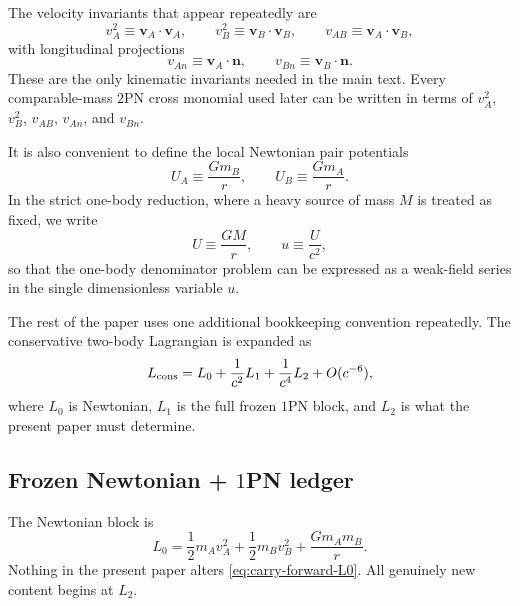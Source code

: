 \documentclass[11pt]{article}
\newcommand{\vct}{\mathbf v}
\newcommand{\nvec}{\mathbf n}
\newcommand{\OnePN}{\mathrm{1PN}}
\newcommand{\TwoPN}{\mathrm{2PN}}
\begin{document}
The velocity invariants that appear repeatedly are
\begin{equation}
v_A^2\equiv \vct_A\!\cdot\!\vct_A,
\qquad
v_B^2\equiv \vct_B\!\cdot\!\vct_B,
\qquad
v_{AB}\equiv \vct_A\!\cdot\!\vct_B,
\label{eq:carry-forward-vinvariants-1}
\end{equation}
with longitudinal projections
\begin{equation}
v_{An}\equiv \vct_A\!\cdot\!\nvec,
\qquad
v_{Bn}\equiv \vct_B\!\cdot\!\nvec.
\label{eq:carry-forward-vinvariants-2}
\end{equation}
These are the only kinematic invariants needed in the main text. Every comparable-mass
\(\TwoPN\) cross monomial used later can be written in terms of
\(v_A^2\), \(v_B^2\), \(v_{AB}\), \(v_{An}\), and \(v_{Bn}\).

It is also convenient to define the local Newtonian pair potentials
\begin{equation}
U_A\equiv \frac{Gm_B}{r},
\qquad
U_B\equiv \frac{Gm_A}{r}.
\label{eq:carry-forward-UAUB}
\end{equation}
In the strict one-body reduction, where a heavy source of mass \(M\) is treated as fixed,
we write
\begin{equation}
U\equiv \frac{GM}{r},
\qquad
u\equiv \frac{U}{c^2},
\label{eq:carry-forward-u}
\end{equation}
so that the one-body denominator problem can be expressed as a weak-field series in the
single dimensionless variable \(u\).

The rest of the paper uses one additional bookkeeping convention repeatedly. The
conservative two-body Lagrangian is expanded as
\begin{equation}
L_{\rm cons}=L_0+\frac{1}{c^2}L_1+\frac{1}{c^4}L_2+O(c^{-6}),
\label{eq:carry-forward-pn-expansion}
\end{equation}
where \(L_0\) is Newtonian, \(L_1\) is the full frozen \(\OnePN\) block, and \(L_2\) is
what the present paper must determine.

\subsection{Frozen Newtonian + \texorpdfstring{$1$}{1}PN ledger}
\label{sec:carry-forward-1pn-ledger}

The Newtonian block is
\begin{equation}
L_0=
\frac12 m_A v_A^2
+\frac12 m_B v_B^2
+\frac{Gm_A m_B}{r}.
\label{eq:carry-forward-L0}
\end{equation}
Nothing in the present paper alters \cref{eq:carry-forward-L0}. All genuinely new
content begins at \(L_2\).
\end{document}
